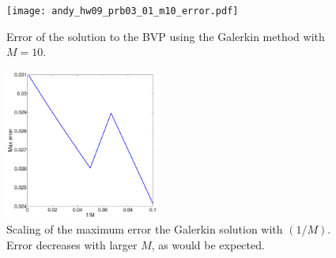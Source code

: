 \documentclass[11pt]{article}
\begin{document}
\begin{enumerate}
\begin{figure}[h!]
  \centering
    \texttt{[image: andy\_hw09\_prb03\_01\_m10\_error.pdf]}
  \caption{Error of the solution to the BVP using the Galerkin method with $M=10$.}
\end{figure}

\begin{figure}[h!]
  \centering
    \includegraphics[width=0.45\textwidth]{andy_hw09_prb03_02.pdf}
  \caption{Scaling of the maximum error the Galerkin solution with $(1/M)$. Error decreases with larger $M$, as would be expected.} 
    \end{figure}

\end{enumerate}
\end{document}
